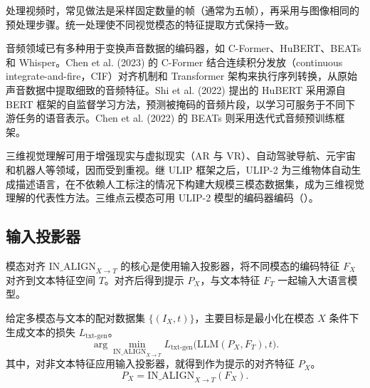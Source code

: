 处理视频时，常见做法是采样固定数量的帧（通常为五帧），再采用与图像相同的预处理步骤。统一处理使不同视觉模态的特征提取方式保持一致。

音频领域已有多种用于变换声音数据的编码器，如 C-Former、HuBERT、BEATs 和 Whisper。Chen et al. (2023) 的 C-Former 结合连续积分发放（continuous integrate-and-fire，CIF）对齐机制和 Transformer 架构来执行序列转换，从原始声音数据中提取细致的音频特征。Shi et al. (2022) 提出的 HuBERT 采用源自 BERT 框架的自监督学习方法，预测被掩码的音频片段，以学习可服务于不同下游任务的语音表示。Chen et al. (2022) 的 BEATs 则采用迭代式音频预训练框架。

三维视觉理解可用于增强现实与虚拟现实（AR 与 VR）、自动驾驶导航、元宇宙和机器人等领域，因而受到重视。继 ULIP 框架之后，ULIP-2 为三维物体自动生成描述语言，在不依赖人工标注的情况下构建大规模三模态数据集，成为三维视觉理解的代表性方法。三维点云模态可用 ULIP-2 模型的编码器编码（）。

\subsection{输入投影器}
\label{sec:ch09-input-projector}
\begin{keypoint}
模态对齐 $\mathrm{IN\_ALIGN}_{X\to T}$ 的核心是使用输入投影器，将不同模态的编码特征 $F_X$ 对齐到文本特征空间 $T$。对齐后得到提示 $P_X$，与文本特征 $F_T$ 一起输入大语言模型。
\end{keypoint}


给定多模态与文本的配对数据集 $\{(I_X,t)\}$，主要目标是最小化在模态 $X$ 条件下生成文本的损失 $L_{\text{txt-gen}}$。
\begin{equation}
\arg\min_{\mathrm{IN\_ALIGN}_{X\to T}}
L_{\text{txt-gen}}\bigl(\mathrm{LLM}(P_X,F_T),t\bigr).
\label{eq:ch09-input-loss}
\end{equation}
其中，对非文本特征应用输入投影器，就得到作为提示的对齐特征 $P_X$。
\begin{equation}
P_X=\mathrm{IN\_ALIGN}_{X\to T}(F_X).
\label{eq:ch09-input-projection}
\end{equation}

